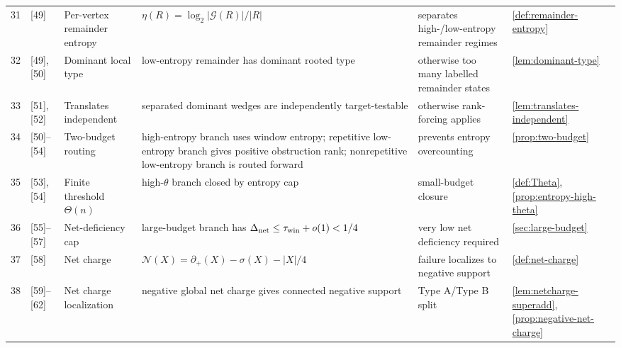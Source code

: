 \documentclass[11pt]{article}
\newcommand{\defp}{\partial_+}
\newcommand{\No}{\mathcal N}
\begin{document}
{\begin{longtable}{C{0.04\textwidth} L{0.13\textwidth} L{0.17\textwidth} L{0.25\textwidth} L{0.21\textwidth} L{0.12\textwidth}}
31 & [49] & Per-vertex remainder entropy & $\eta(R)=\log_2|\mathcal G(R)|/|R|$ & separates high-/low-entropy remainder regimes & \cref{def:remainder-entropy} \\
32 & [49], [50] & Dominant local type & low-entropy remainder has dominant rooted type & otherwise too many labelled remainder states & \cref{lem:dominant-type} \\
33 & [51], [52] & Translates independent & separated dominant wedges are independently target-testable & otherwise rank-forcing applies & \cref{lem:translates-independent} \\
34 & [50]--[54] & Two-budget routing & high-entropy branch uses window entropy; repetitive low-entropy branch gives positive obstruction rank; nonrepetitive low-entropy branch is routed forward & prevents entropy overcounting & \cref{prop:two-budget} \\
35 & [53], [54] & Finite threshold $\Theta(n)$ & high-$\theta$ branch closed by entropy cap & small-budget closure & \cref{def:Theta}, \cref{prop:entropy-high-theta} \\
36 & [55]--[57] & Net-deficiency cap & large-budget branch has $\Delta_{\mathrm{net}}\le\tau_{\rm win}+o(1)<1/4$ & very low net deficiency required & \cref{sec:large-budget} \\
37 & [58] & Net charge & $\No(X)=\defp(X)-\sigma(X)-|X|/4$ & failure localizes to negative support & \cref{def:net-charge} \\
38 & [59]--[62] & Net charge localization & negative global net charge gives connected negative support & Type A/Type B split & \cref{lem:netcharge-superadd}, \cref{prop:negative-net-charge} \\

\end{longtable}}
\end{document}
